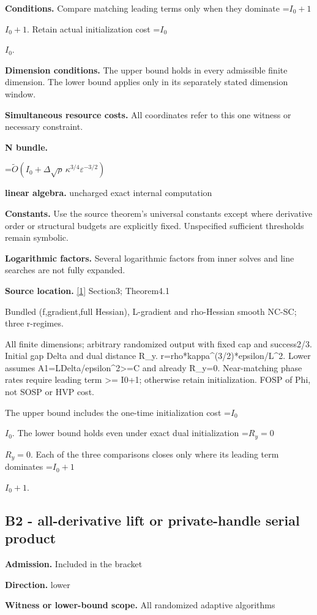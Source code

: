 \documentclass[10pt,a4paper]{article}
\newcommand{\AtlasMath}[1]{\par\begingroup\centering\setbox0=\hbox{$\displaystyle #1$}\ifdim\wd0>1.4\linewidth\typeout{ATLAS WIDE FORMULA: \the\wd0}\fi\ifdim\wd0>\linewidth\resizebox{\linewidth}{!}{\box0}\else\box0\fi\par\endgroup}
\newcommand{\AtlasInlineMath}[1]{\begingroup\setbox0=\hbox{$#1$}\ifdim\wd0>.4\linewidth\endgroup\AtlasMath{#1}\else\endgroup$#1$\fi}
\begin{document}
\textbf{Conditions.} Compare matching leading terms only when they dominate \AtlasInlineMath{I_0+1}. Retain actual initialization cost \AtlasInlineMath{I_0}.

\textbf{Dimension conditions.} The upper bound holds in every admissible finite dimension. The lower bound applies only in its separately stated dimension window.

\textbf{Simultaneous resource costs.} All coordinates refer to this one witness or necessary constraint.

\textbf{N bundle.}

\AtlasMath{\widetilde O(I_0+\Delta\sqrt\rho\,\kappa^{3/4}\varepsilon^{-3/2})}
\textbf{linear algebra.} uncharged exact internal computation

\textbf{Constants.} Use the source theorem’s universal constants except where derivative order or structural budgets are explicitly fixed. Unspecified sufficient thresholds remain symbolic.

\textbf{Logarithmic factors.} Several logarithmic factors from inner solves and line searches are not fully expanded.

\textbf{Source location.} \href{https://arxiv.org/pdf/2610.16771v2}{[1]} Section3; Theorem4.1

Bundled (f,gradient,full Hessian), L-gradient and rho-Hessian smooth NC-SC; three r-regimes.

All finite dimensions; arbitrary randomized output with fixed cap and success2/3. Initial gap Delta and dual distance R\_y. r=rho*kappa\textasciicircum{}(3/2)*epsilon/L\textasciicircum{}2. Lower assumes A1=LDelta/epsilon\textasciicircum{}2>=C and already R\_y=0. Near-matching phase rates require leading term >= I0+1; otherwise retain initialization. FOSP of Phi, not SOSP or HVP cost.

The upper bound includes the one-time initialization cost \AtlasInlineMath{I_0}. The lower bound holds even under exact dual initialization \AtlasInlineMath{R_y=0}. Each of the three comparisons closes only where its leading term dominates \AtlasInlineMath{I_0+1}.

\subsection{B2 - all-derivative lift or private-handle serial product}
\textbf{Admission.} Included in the bracket

\textbf{Direction.} lower

\textbf{Witness or lower-bound scope.} All randomized adaptive algorithms
\end{document}
